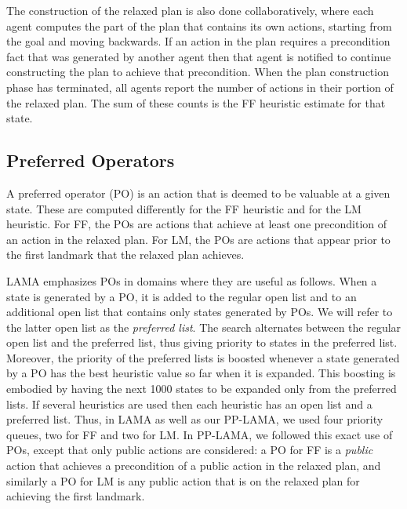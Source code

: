 \documentclass[letterpaper]{article}
\theoremstyle{definition}
\begin{document}
The construction of the relaxed plan is also done collaboratively, where each agent computes the part of the plan that contains its own actions, starting from the goal and moving backwards. If an action in the plan requires a precondition fact that was generated by another agent then that agent is notified to continue constructing the plan to achieve that precondition. When the plan construction phase has terminated, all agents report the number of actions in their portion of the relaxed plan. The sum of these counts is the FF heuristic estimate for that state.


\subsection{Preferred Operators}
\label{sec:preferredOperators}
A preferred operator (PO) is an action that is deemed to be valuable at a given state. These are computed differently for the FF heuristic and for the LM heuristic.  %
For FF, the POs are actions that achieve at least one precondition of an action in the relaxed plan. For LM, the POs are actions that appear prior to the first landmark that the relaxed plan achieves.

LAMA emphasizes POs in domains where they are useful as follows. When a state is generated by a PO, it is added to the regular open list and to an additional open list that contains only states generated by POs. We will refer to the latter open list as the {\em preferred list}. The search alternates between the regular open list and the preferred list, thus giving priority to states in the preferred list. Moreover, the priority of the preferred lists is boosted whenever a state generated by a PO has the best heuristic value so far when it is expanded. This boosting is embodied by having the next 1000 states to be expanded only from the preferred lists. If several heuristics are used then each heuristic has an open list and a preferred list. Thus, in LAMA as well as our PP-LAMA, we used four priority queues, two for FF and two for LM. In PP-LAMA, we followed this exact use of POs, except that only public actions are considered: a PO for FF is a {\em public} action that achieves a precondition of a public action in the relaxed plan, and similarly a PO for LM is any public action that is on the relaxed plan for achieving the first landmark. %
\end{document}
